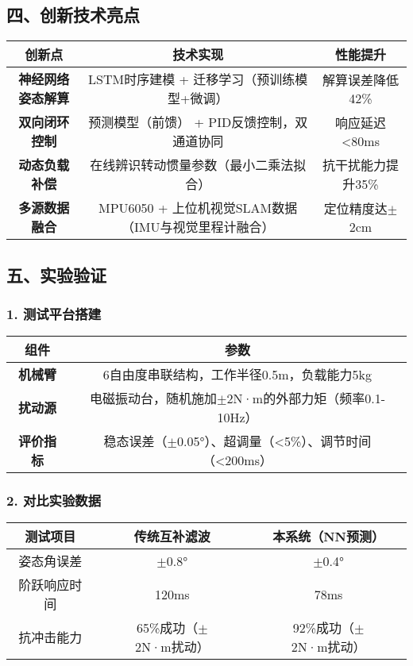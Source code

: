 \documentclass[12pt, a4paper]{article}
\begin{document}
\subsection{四、创新技术亮点}

\begin{longtable}{|c|c|c|}
\hline
创新点 & 技术实现 & 性能提升 \\
\hline
\textbf{神经网络姿态解算} & LSTM时序建模 + 迁移学习（预训练模型+微调） & 解算误差降低42\% \\
\hline
\textbf{双向闭环控制} & 预测模型（前馈） + PID反馈控制，双通道协同 & 响应延迟<80ms \\
\hline
\textbf{动态负载补偿} & 在线辨识转动惯量参数（最小二乘法拟合） & 抗干扰能力提升35\% \\
\hline
\textbf{多源数据融合} & MPU6050 + 上位机视觉SLAM数据（IMU与视觉里程计融合） & 定位精度达$\pm$2cm \\
\hline
\end{longtable}

\subsection{五、实验验证}

\subsubsection{1. 测试平台搭建}

\begin{longtable}{|c|c|}
\hline
组件 & 参数 \\
\hline
\textbf{机械臂} & 6自由度串联结构，工作半径0.5m，负载能力5kg \\
\hline
\textbf{扰动源} & 电磁振动台，随机施加$\pm$2N·m的外部力矩（频率0.1-10Hz） \\
\hline
\textbf{评价指标} & 稳态误差（$\pm$0.05°）、超调量（<5\%）、调节时间（<200ms） \\
\hline
\end{longtable}

\subsubsection{2. 对比实验数据}

\begin{longtable}{|c|c|c|}
\hline
测试项目 & 传统互补滤波 & 本系统（NN预测） \\
\hline
姿态角误差 & $\pm$0.8° & $\pm$0.4° \\
\hline
阶跃响应时间 & 120ms & 78ms \\
\hline
抗冲击能力 & 65\%成功（$\pm$2N·m扰动） & 92\%成功（$\pm$2N·m扰动） \\
\hline
\end{longtable}
\end{document}
